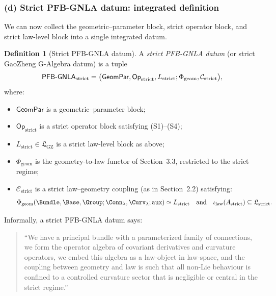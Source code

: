 \documentclass[11pt]{book}
\theoremstyle{plain}
\theoremstyle{definition}
\newtheorem{definition}[theorem]{Definition} \theoremstyle{remark}
\newcommand{\GZLS}{\ensuremath{\mathfrak{L}_{\mathrm{GZ}}}}       \newcommand{\GZLT}{\ensuremath{M_{!w}}}                           \newcommand{\GZLOC}{\ensuremath{A_M}}                             \newcommand{\GZLCurv}{\ensuremath{\mathcal{F}_{\mathrm{law}}}}
\begin{document}
\subsubsection*{(d) Strict PFB-GNLA datum: integrated definition}

We can now collect the geometric–parameter block, strict operator block,
and strict law-level block into a single integrated datum.

\begin{definition}[Strict PFB-GNLA datum]
A \emph{strict PFB-GNLA datum} (or strict GaoZheng G-Algebra datum)
  is a tuple
  \[
    \mathsf{PFB\text- GNLA}_{\mathrm{strict}}
    =
    \bigl(
      \mathsf{GeomPar},
      \mathsf{Op}_{\mathrm{strict}},
      L_{\mathrm{strict}};
      \Phi_{\mathrm{geom}},\mathcal{C}_{\mathrm{strict}}
    \bigr),
  \]
  where:
  \begin{itemize}
    \item $\mathsf{GeomPar}$ is a geometric–parameter block;
    \item $\mathsf{Op}_{\mathrm{strict}}$ is a strict operator block
          satisfying (S1)–(S4);
    \item $L_{\mathrm{strict}}\in\GZLS$ is a strict law-level block as
          above;
    \item $\Phi_{\mathrm{geom}}$ is the geometry-to-law functor of
          Section~3.3, restricted to the strict regime;
    \item $\mathcal{C}_{\mathrm{strict}}$ is a strict law–geometry
          coupling (as in Section~2.2) satisfying:
          \[
             \Phi_{\mathrm{geom}}
               (\Bundle,\Base,\Group;\Conn_\lambda,\Curv_\lambda;\text{aux})
             \simeq
             L_{\mathrm{strict}}
             \quad\text{and}\quad
             \iota_{\mathrm{law}}(A_{\mathrm{strict}})
             \subseteq
             \mathfrak{L}_{\mathrm{strict}}.
          \]
  \end{itemize}
\end{definition}

Informally, a strict PFB-GNLA datum says:

\begin{quote}
  “We have a principal bundle with a parameterized family of
   connections, we form the operator algebra of covariant derivatives
   and curvature operators, we embed this algebra as a law-object in
   law-space, and the coupling between geometry and law is such that
   all non-Lie behaviour is confined to a controlled curvature sector
   that is negligible or central in the strict regime.”
\end{quote}
\end{document}

